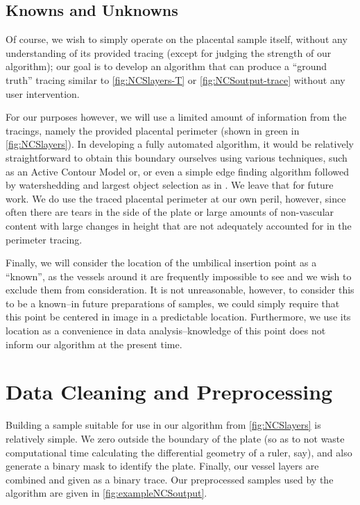 \subsection{Knowns and Unknowns}
Of course, we wish to simply operate on the placental sample itself, without any understanding of its provided tracing (except for judging the strength of our algorithm);
our goal is to develop an algorithm that can produce a ``ground truth'' tracing similar to \cref{fig:NCSlayers-T} or \cref{fig:NCSoutput-trace} without any user intervention.

For our purposes however, we will use a limited amount of information from the tracings, namely the provided placental perimeter (shown in green in \cref{fig:NCSlayers}). In developing a fully automated algorithm, it would be relatively straightforward to obtain this boundary ourselves using various techniques, such as an Active Contour Model \cite{activecontours} or, or even a simple edge finding algorithm followed by watershedding and largest object selection as in \cite{huynh2013filter}. We leave that for future work. We do use the traced placental perimeter at our own peril, however, since often there are tears in the side of the plate or large amounts of non-vascular content with large changes in height that are not adequately accounted for in the perimeter tracing.

Finally, we will consider the location of the umbilical insertion point as a ``known'', as the vessels around it are frequently impossible to see and we wish to exclude them from consideration. It is not unreasonable, however, to consider this to be a known--in future preparations of samples, we could simply require that this point be centered in image in a predictable location. Furthermore, we use its location as a convenience in data analysis--knowledge of this point does not inform our algorithm at the present time.


\section{Data Cleaning and Preprocessing}

Building a sample suitable for use in our algorithm from \cref{fig:NCSlayers} is relatively simple. We  zero  outside the boundary of the plate (so as to not waste computational time calculating the differential geometry of a ruler, say), and also generate a binary mask to identify the plate. Finally, our vessel layers are combined and given as a binary trace. Our preprocessed samples used by the algorithm are given in \cref{fig:exampleNCSoutput}.

